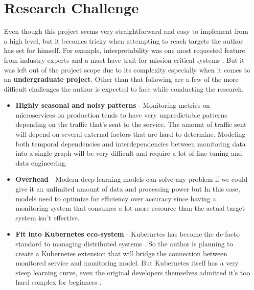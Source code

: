 \section{Research Challenge}

Even though this project seems very straightforward and easy to implement from a high level, but it becomes tricky when attempting to reach targets the author has set for himself. For example, interpretability was one most requested feature from industry experts and a must-have trait for mission-critical systems \citep{ribeiro2016should}. But it was left out of the project scope due to its complexity especially when it comes to an \textbf{undergraduate project}. Other than that following are a few of the more difficult challenges the author is expected to face while conducting the research.\\

\begin{itemize}[leftmargin=*] 
\item \textbf{Highly seasonal and noisy patterns} - Monitoring metrics on microservices on production tends to have very unpredictable patterns depending on the traffic that's sent to the service. The amount of traffic sent will depend on several external factors that are hard to determine. Modeling both temporal dependencies and interdependencies between monitoring data into a single graph will be very difficult and require a lot of fine-tuning and data engineering.
\item \textbf{Overhead} - Modern deep learning models can solve any problem if we could give it an unlimited amount of data and processing power but In this case, models need to optimize for efficiency over accuracy since having a monitoring system that consumes a lot more resource than the actual target system isn't effective.
\item \textbf{Fit into Kubernetes eco-system} - Kubernetes has become the de-facto standard to managing distributed systems \citep{WhatisCo78:online}. So the author is planning to create a Kubernetes extension that will bridge the connection between monitored service and monitoring model. But Kubernetes itself has a very steep learning curve, even the original developers themselves admitted it's too hard complex for beginners \cite{Googlead4:online}.
\end{itemize}
